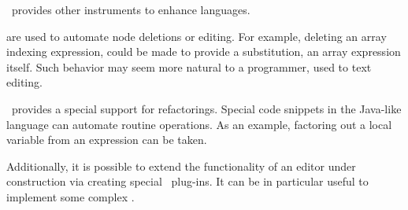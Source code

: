 \jbmps\ provides other instruments to enhance languages. 

 are used to automate node deletions or editing. For example, deleting an array indexing expression, could be made
to provide a substitution, an array expression itself. Such behavior may seem more natural to a programmer, used to text editing.

\jbmps\ provides a special support for refactorings. Special code snippets in the Java-like language can automate routine operations.
As an example, factoring out a local variable from an expression can be taken.

Additionally, it is possible to extend the functionality of an editor under construction via creating special \jbmps\ plug-ins. 
It can be in particular useful to implement some complex .